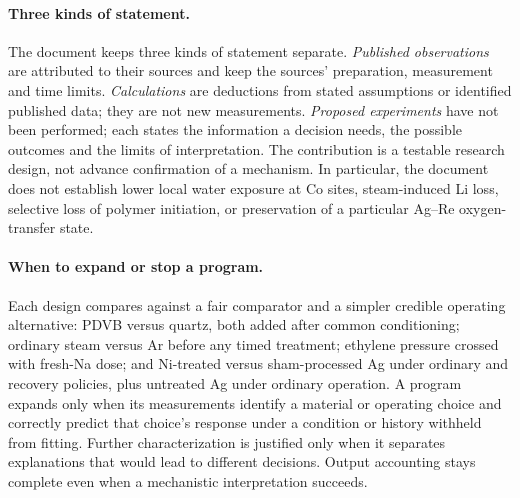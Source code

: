 \paragraph{Three kinds of statement.}
The document keeps three kinds of statement separate. \emph{Published observations} are attributed to their sources and keep the sources' preparation, measurement and time limits. \emph{Calculations} are deductions from stated assumptions or identified published data; they are not new measurements. \emph{Proposed experiments} have not been performed; each states the information a decision needs, the possible outcomes and the limits of interpretation. The contribution is a testable research design, not advance confirmation of a mechanism. In particular, the document does not establish lower local water exposure at Co sites, steam-induced Li loss, selective loss of polymer initiation, or preservation of a particular Ag--Re oxygen-transfer state.

\paragraph{When to expand or stop a program.}
Each design compares against a fair comparator and a simpler credible operating alternative: PDVB versus quartz, both added after common conditioning; ordinary steam versus Ar before any timed \COtwo{} treatment; ethylene pressure crossed with fresh-Na dose; and Ni-treated versus sham-processed Ag under ordinary and recovery policies, plus untreated Ag under ordinary operation. A program expands only when its measurements identify a material or operating choice and correctly predict that choice's response under a condition or history withheld from fitting. Further characterization is justified only when it separates explanations that would lead to different decisions. Output accounting stays complete even when a mechanistic interpretation succeeds.


